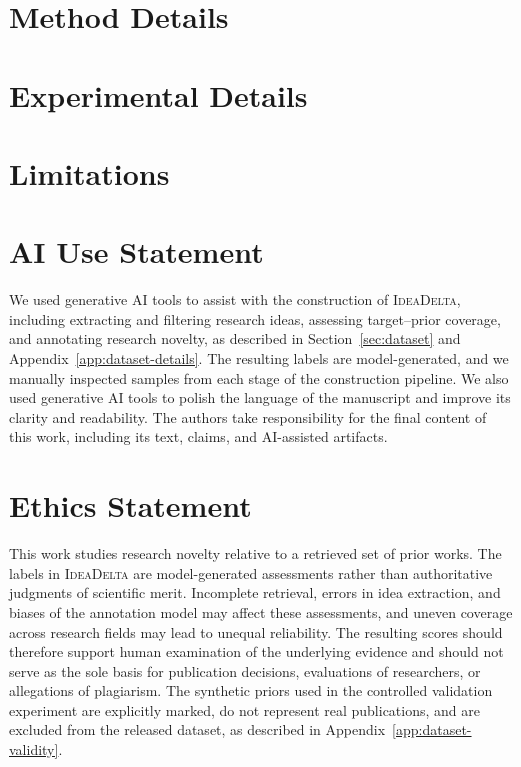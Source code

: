 \documentclass{article} %
\begin{document}


\section{Method Details}
\label{app:method}


\section{Experimental Details}
\label{app:experiments}



\section{Limitations}
\label{app:limitations}



\section{AI Use Statement}
\label{app:ai-use}
We used generative AI tools to assist with the construction of
\textsc{IdeaDelta}, including extracting and filtering research ideas,
assessing target--prior coverage, and annotating research novelty, as
described in Section~\ref{sec:dataset} and Appendix~\ref{app:dataset-details}.
The resulting labels are model-generated, and we manually inspected samples
from each stage of the construction pipeline. We also used generative AI tools
to polish the language of the manuscript and improve its clarity and
readability. The authors take responsibility for the final content of this
work, including its text, claims, and AI-assisted artifacts.

\section{Ethics Statement}
\label{app:ethics}
This work studies research novelty relative to a retrieved set of prior works.
The labels in \textsc{IdeaDelta} are model-generated assessments rather than
authoritative judgments of scientific merit. Incomplete retrieval, errors in
idea extraction, and biases of the annotation model may affect these
assessments, and uneven coverage across research fields may lead to unequal
reliability. The resulting scores should therefore support human examination
of the underlying evidence and should not serve as the sole basis for
publication decisions, evaluations of researchers, or allegations of
plagiarism. The synthetic priors used in the controlled validation experiment
are explicitly marked, do not represent real publications, and are excluded
from the released dataset, as described in Appendix~\ref{app:dataset-validity}.
\end{document}
